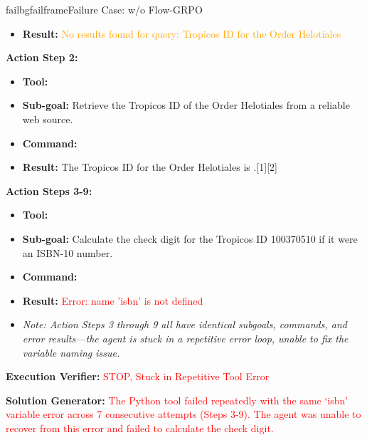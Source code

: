 \begin{small}
\begin{center}
\begin{casebox}{failbg}{failframe}{Failure Case: \model w/o Flow-GRPO}
\begin{itemize}[nosep, leftmargin=*]
        \item \textbf{Result:} \textcolor{orange}{No results found for query: Tropicos ID for the Order Helotiales}
    \end{itemize}

    \vspace{1em}

    \textbf{Action Step 2:}
    \begin{itemize}[nosep, leftmargin=*]
        \item \textbf{Tool:} 
        \item \textbf{Sub-goal:} Retrieve the Tropicos ID of the Order Helotiales from a reliable web source.
        \item \textbf{Command:}

        \item \textbf{Result:} The Tropicos ID for the Order Helotiales is .[1][2]
    \end{itemize}

    \vspace{1em}

    \textbf{Action Steps 3-9:}
    \begin{itemize}[nosep, leftmargin=*]
        \item \textbf{Tool:} 
        \item \textbf{Sub-goal:} Calculate the check digit for the Tropicos ID 100370510 if it were an ISBN-10 number.
        \item \textbf{Command:}

        \item \textbf{Result:} \textcolor{red}{Error: name 'isbn' is not defined}
        \item \textit{Note: Action Steps 3 through 9 all have identical subgoals, commands, and error results—the agent is stuck in a repetitive error loop, unable to fix the variable naming issue.}
    \end{itemize}

    \vspace{1em}

    \textbf{Execution Verifier:} \textcolor{red}{STOP, Stuck in Repetitive Tool Error}

    \vspace{1em}

    \textbf{Solution Generator: } \textcolor{red}{The Python tool failed repeatedly with the same `isbn' variable error across 7 consecutive attempts (Steps 3-9). The agent was unable to recover from this error and failed to calculate the check digit.}
\end{casebox}

\end{center}    
\end{small}